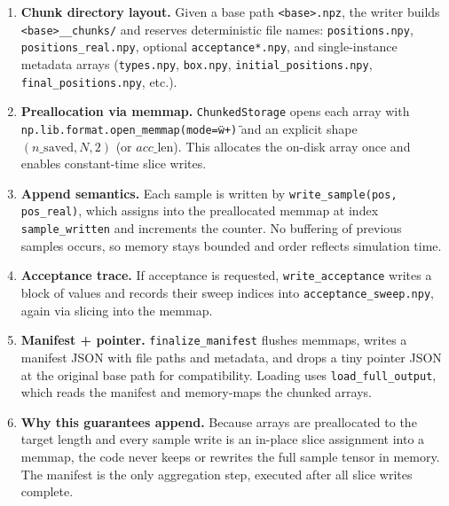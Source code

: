 \documentclass[11pt]{article}
\begin{document}
\begin{enumerate}
  \item \textbf{Chunk directory layout.} Given a base path \texttt{<base>.npz}, the writer builds \texttt{<base>\_\_chunks/} and reserves deterministic file names: \texttt{positions.npy}, \texttt{positions\_real.npy}, optional \texttt{acceptance*.npy}, and single-instance metadata arrays (\texttt{types.npy}, \texttt{box.npy}, \texttt{initial\_positions.npy}, \texttt{final\_positions.npy}, etc.).
  \item \textbf{Preallocation via memmap.} \texttt{ChunkedStorage} opens each array with \texttt{np.lib.format.open\_memmap(mode=\"w+\")} and an explicit shape \((n\_\text{saved}, N, 2)\) (or \(acc\_\text{len}\)). This allocates the on-disk array once and enables constant-time slice writes.
  \item \textbf{Append semantics.} Each sample is written by \texttt{write\_sample(pos, pos\_real)}, which assigns into the preallocated memmap at index \texttt{sample\_written} and increments the counter. No buffering of previous samples occurs, so memory stays bounded and order reflects simulation time.
  \item \textbf{Acceptance trace.} If acceptance is requested, \texttt{write\_acceptance} writes a block of values and records their sweep indices into \texttt{acceptance\_sweep.npy}, again via slicing into the memmap.
\item \textbf{Manifest + pointer.} \texttt{finalize\_manifest} flushes memmaps, writes a manifest JSON with file paths and metadata, and drops a tiny pointer JSON at the original base path for compatibility. Loading uses \texttt{load\_full\_output}, which reads the manifest and memory-maps the chunked arrays.
\item \textbf{Why this guarantees append.} Because arrays are preallocated to the target length and every sample write is an in-place slice assignment into a memmap, the code never keeps or rewrites the full sample tensor in memory. The manifest is the only aggregation step, executed after all slice writes complete.
\end{enumerate}
\end{document}
